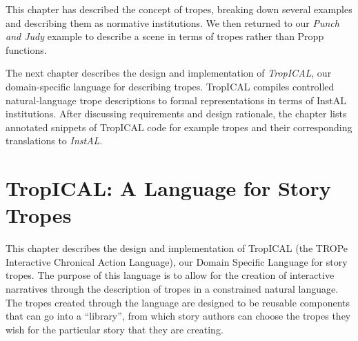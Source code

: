 \documentclass[11pt]{report}
\begin{document}

This chapter has described the concept of tropes, breaking down several examples
and describing them as normative institutions. We then returned to our
\emph{Punch and Judy} example to describe a scene in terms of tropes rather than
Propp functions. 

The next chapter describes the design and implementation of \emph{TropICAL}, our
domain-specific language for describing tropes. TropICAL compiles controlled
natural-language trope descriptions to formal representations in terms of InstAL
institutions. After discussing requirements and design rationale, the chapter
lists annotated snippets of TropICAL code for example tropes and their
corresponding translations to \emph{InstAL}.

\chapter{TropICAL: A Language for Story Tropes}
\label{cha:tropical}

This chapter describes the design and implementation of TropICAL (the TROPe
Interactive Chronical Action Language), our Domain Specific Language for
story tropes. The purpose of this language is to allow for the
creation of interactive narratives through the description of tropes in a
constrained natural language. The tropes created through the language are
designed to be reusable components that can go into a ``library'', from which
story authors can choose the tropes they wish for the particular story that they
are creating.
\end{document}

